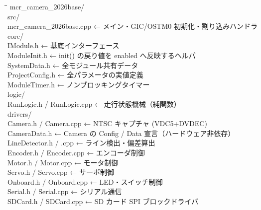 \documentclass[a4paper,11pt,dvipdfmx]{jsarticle}
\begin{document}
\begin{tcolorbox}[colback=codebg, colframe=accentblue!40, arc=2mm]
\ttfamily\small
\begin{tabbing}
\hspace{4mm}\=\hspace{4mm}\=\hspace{4mm}\=\hspace{4mm}\=\kill
mcr\_camera\_2026base/ \\
\> src/ \\
\>\> mcr\_camera\_2026base.cpp \quad\textrm{\color{gray}← メイン・GIC/OSTM0 初期化・割り込みハンドラ} \\
\>\> core/ \\
\>\>\> IModule.h \quad\textrm{\color{gray}← 基底インターフェース} \\
\>\>\> ModuleInit.h \quad\textrm{\color{gray}← init() の戻り値を enabled へ反映するヘルパ} \\
\>\>\> SystemData.h \quad\textrm{\color{gray}← 全モジュール共有データ} \\
\>\>\> ProjectConfig.h \quad\textrm{\color{gray}← 全パラメータの実値定義} \\
\>\>\> ModuleTimer.h \quad\textrm{\color{gray}← ノンブロッキングタイマー} \\
\>\> logic/ \\
\>\>\> RunLogic.h / RunLogic.cpp \quad\textrm{\color{gray}← 走行状態機械（純関数）} \\
\>\> drivers/ \\
\>\>\> Camera.h / Camera.cpp \quad\textrm{\color{gray}← NTSC キャプチャ (VDC5+DVDEC)} \\
\>\>\> CameraData.h \quad\textrm{\color{gray}← Camera の Config / Data 宣言（ハードウェア非依存）} \\
\>\>\> LineDetector.h / .cpp \quad\textrm{\color{gray}← ライン検出・偏差算出} \\
\>\>\> Encoder.h / Encoder.cpp \quad\textrm{\color{gray}← エンコーダ制御} \\
\>\>\> Motor.h / Motor.cpp \quad\textrm{\color{gray}← モータ制御} \\
\>\>\> Servo.h / Servo.cpp \quad\textrm{\color{gray}← サーボ制御} \\
\>\>\> Onboard.h / Onboard.cpp \quad\textrm{\color{gray}← LED・スイッチ制御} \\
\>\>\> Serial.h / Serial.cpp \quad\textrm{\color{gray}← シリアル通信} \\
\>\>\> SDCard.h / SDCard.cpp \quad\textrm{\color{gray}← SD カード SPI ブロックドライバ} \\

\end{tabbing}
\end{tcolorbox}
\end{document}
